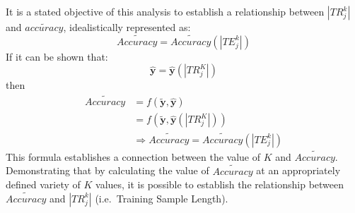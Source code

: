 \documentclass[12pt,]{article}
\begin{document}
It is a stated objective of this analysis to establish a relationship
between \(|TR_{j}^{k}|\) and \(\tilde{accuracy}\), idealistically
represented as: \[
\tilde{Accuracy} = \tilde{Accuracy}\left( |TE_{j}^{k}|  \right)  \tag{EQ: 2.2-1} \label{EQ: 2.2-1} 
\] If it can be shown that:
\[\mathbf{\hat{y}}=\mathbf{\hat{y}}\left(|TR_{j}^{K}| \right) \] then
\begin{align*}
\tilde{Accuracy} &= f\left(\mathbf{\tilde{y}}, \mathbf{\hat{y}} \right) \\[0.5em]
&= f\left(\mathbf{\tilde{y}}, \mathbf{\hat{y}} (|TR_{j}^{K}|)  \right) \\[0.5em]
&\Rightarrow \tilde{Accuracy}= \tilde{Accuracy}\left( |TE_{j}^{k}|  \right)
\end{align*} This formula establishes a connection between the value of
\(K\) and \(\tilde{Accuracy}\). Demonstrating that by calculating the
value of \(\tilde{Accuracy}\) at an appropriately defined variety of
\(K\) values, it is possible to establish the relationship between
\(\tilde{Accuracy}\) and \(|TR_{j}^{k}|\) (i.e.~Training Sample Length).
\end{document}
